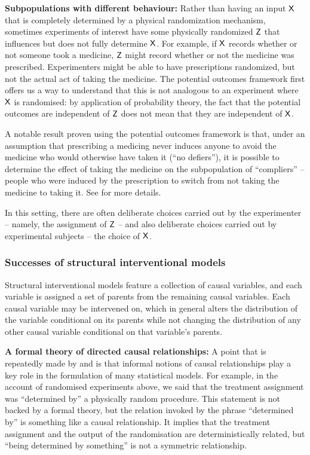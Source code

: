 \textbf{Subpopulations with different behaviour:} Rather than having an input $\mathsf{X}$ that is completely determined by a physical randomization mechanism, sometimes experiments of interest have some physically randomized $\mathsf{Z}$ that influences but does not fully determine $\mathsf{X}$. For example, if $\mathsf{X}$ records whether or not someone took a medicine, $\mathsf{Z}$ might record whether or not the medicine was prescribed. Experimenters might be able to have prescriptions randomized, but not the actual act of taking the medicine. The potential outcomes framework first offers us a way to understand that this is not analogous to an experiment where $\mathsf{X}$ is randomised: by application of probability theory, the fact that the potential outcomes are independent of $\mathsf{Z}$ does not mean that they are independent of $\mathsf{X}$.

A notable result proven using the potential outcomes framework is that, under an assumption that prescribing a medicing never induces anyone to avoid the medicine who would otherwise have taken it (``no defiers''), it is possible to determine the effect of taking the medicine on the subpopulation of ``compliers'' -- people who were induced by the prescription to switch from not taking the medicine to taking it. See \citep{imbens_identification_1994} for more details.

In this setting, there are often deliberate choices carried out by the experimenter -- namely, the assignment of $\mathsf{Z}$ -- and also deliberate choices carried out by experimental subjects -- the choice of $\mathsf{X}$.

\subsubsection{Successes of structural interventional models}

Structural interventional models feature a collection of causal variables, and each variable is assigned a set of parents from the remaining causal variables. Each causal variable may be intervened on, which in general alters the distribution of the variable conditional on its parents while not changing the distribution of any other causal variable conditional on that variable's parents.

\textbf{A formal theory of directed causal relationships:} A point that is repeatedly made by \citet{pearl_causality:_2009} and \citet{pearl_book_2018} is that informal notions of causal relationships play a key role in the formulation of many statistical models. For example, in the account of randomised experiments above, we said that the treatment assignment was ``determined by'' a physically random procedure. This statement is not backed by a formal theory, but the relation invoked by the phrase ``determined by'' is something like a causal relationship. It implies that the treatment assignment and the output of the randomisation are deterministically related, but ``being determined by something'' is not a symmetric relationship.

